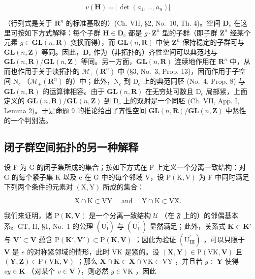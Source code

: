 \[
v (\mathbf {H}) = | \det (a _ {1}, \dots , a _ {n}) |
\]

（行列式是关于 \(\mathbf{R}^n\) 的标准基取的）(Ch. VII, §2, No.~10, Th. 4)。空间 \(\mathbf{D}_c\) 在这里可按如下方式解释：每个子群 \(\mathbf{H} \in \mathbf{D}_c\) 都是 \(g \cdot \mathbf{Z}^n\) 型的子群（即子群 \(\mathbf{Z}^n\) 经某个元素 \(g \in \mathbf{GL}(n, \mathbf{R})\) 变换而得），而 \(\mathbf{GL}(n, \mathbf{R})\) 中使 \(\mathbf{Z}^n\) 保持稳定的子群可与 \(\mathbf{GL}(n, \mathbf{Z})\) 等同。因此，\(\mathbf{D}_c\) 作为（非拓扑的）齐性空间可以典范地与 \(\mathbf{GL}(n, \mathbf{R}) / \mathbf{GL}(n, \mathbf{Z})\) 等同。另一方面，\(\mathbf{GL}(n, \mathbf{R})\) 连续地作用在 \(\mathbf{R}^n\) 中，从而也作用于关于淡拓扑的 \(\mathcal{M}_{+}(\mathbf{R}^{n})\) 中 (§3, No.~3, Prop. 13)，因而作用于子空间 \(\mathrm{N}_c\) （\(\mathcal{M}_{+}(\mathbf{R}^{n})\) 的）中；此外，\(\mathrm{N}_c\) 到 \(\mathrm{D}_c\) 上的典范同胚 (No.~4, Prop. 8) 与 \(\mathbf{GL}(n, \mathbf{R})\) 的运算律相容。由于 \(\mathbf{GL}(n, \mathbf{R})\) 在无穷处可数且 \(\mathrm{D}_c\) 局部紧，上面定义的 \(\mathbf{GL}(n, \mathbf{R}) / \mathbf{GL}(n, \mathbf{Z})\) 到 \(\mathrm{D}_c\) 上的双射是一个同胚 (Ch. VII, App. I, Lemma 2)。于是命题 9 的推论给出了齐性空间 \(\mathbf{GL}(n, \mathbf{R}) / \mathbf{GL}(n, \mathbf{Z})\) 中紧性的一个判别法。

\subsection{闭子群空间拓扑的另一种解释}

设 F 为 G 的闭子集所成的集合；按如下方式在 F 上定义一个分离一致结构：对 G 的每个紧子集 K 以及 e 在 G 中的每个邻域 V，设 \(\mathrm{P}(\mathrm{K},\mathrm{V})\) 为 F 中同时满足下列两个条件的元素对 \((\mathrm{X},\mathrm{Y})\) 所成的集合：

\[
\mathrm{X} \cap \mathrm{K} \subset \mathrm{VY} \quad \text { and } \quad \mathrm{Y} \cap \mathrm{K} \subset \mathrm{VX}.\tag{9}
\]

我们来证明，诸 \(\mathrm{P}(\mathbf{K},\mathbf{V})\) 是一个分离一致结构 \(\mathcal{U}\) （在 \(\mathfrak{F}\) 上的）的邻偶基本系。GT, II, §1, No.~1 的公理 \((\mathrm{U}_{\mathrm{I}}^{\prime})\) 与 \((\mathrm{U}_{\mathrm{II}}^{\prime})\) 显然满足；此外，关系式 \(\mathbf{K} \subset \mathbf{K}'\) 与 \(\mathbf{V}' \subset \mathbf{V}\) 蕴含 \(\mathrm{P}(\mathbf{K}',\mathbf{V}') \subset \mathrm{P}(\mathbf{K},\mathbf{V})\) ；因此为验证 \((\mathrm{U}_{\mathrm{III}}^{\prime})\) ，可以只限于 \(\mathbf{V}\) 是 \(e\) 的对称紧邻域的情形，此时 VK 是紧的。设 \((\mathbf{X},\mathbf{Y}) \in \mathrm{P}(\mathrm{VK},\mathbf{V})\) 且 \((\mathbf{Y},\mathbf{Z}) \in \mathrm{P}(\mathrm{VK},\mathbf{V})\) ；那么 \(\mathbf{X} \cap \mathbf{K} \subset \mathbf{X} \cap \mathrm{VK} \subset \mathrm{VY}\) ，并且若 \(y \in \mathbf{Y}\) 使得 \(vy \in \mathbf{K}\) （对某个 \(v \in \mathbf{V}\) ），则必然 \(y \in \mathrm{VK}\) ，因此

